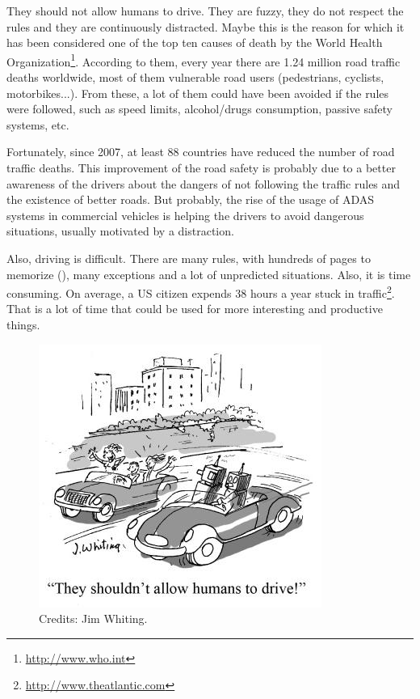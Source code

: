
\graphicspath{{./images/chapter00/bmps/}{./images/chapter00/vects/}{./images/chapter00/}}

\label{ch:chapter00}


They should not allow humans to drive. They are fuzzy, they do not respect the rules and they are continuously distracted. Maybe this is the reason for which it has been considered one of the top ten causes of death by the World Health Organization\footnote{\href{http://www.who.int/features/factfiles/roadsafety/en/}{http://www.who.int}}. According to them, every year there are 1.24 million road traffic deaths worldwide, most of them vulnerable road users (pedestrians, cyclists, motorbikes...). From these, a lot of them could have been avoided if the rules were followed, such as speed limits, alcohol/drugs consumption, passive safety systems, etc. 

Fortunately, since 2007, at least 88 countries have reduced the number of road traffic deaths. This improvement of the road safety is probably due to a better awareness of the drivers about the dangers of not following the traffic rules and the existence of better roads. But probably, the rise of the usage of \ac{ADAS} systems in commercial vehicles is helping the drivers to avoid dangerous situations, usually motivated by a distraction.

Also, driving is difficult. There are many rules, with hundreds of pages to memorize (\cite{schwarzenegger2007california}), many exceptions and a lot of unpredicted situations. Also, it is time consuming. On average, a US citizen expends 38 hours a year stuck in traffic\footnote{\href{http://www.theatlantic.com/business/archive/2013/02/the-american-commuter-spends-38-hours-a-year-stuck-in-traffic/272905}{http://www.theatlantic.com}}. That is a lot of time that could be used for more interesting and productive things.

\begin{figure}\label{fig:cp00_humans_not_drive}
  \centering
  \includegraphics{CarCartoon}
  \caption{Credits: Jim Whiting.}
\end{figure}

